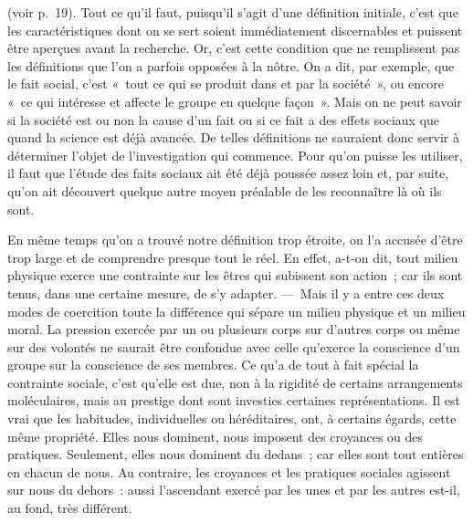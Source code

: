 \documentclass[french,twoside]{book} %
\begin{document}
(voir p. 19). Tout ce qu’il faut, puisqu’il s’agit d’une définition initiale, c’est que les caractéristiques dont on se sert soient immédiatement discernables et puissent être aperçues avant la recherche. Or, c’est cette condition que ne remplissent pas les définitions que l’on a parfois opposées à la nôtre. On a dit, par exemple, que le fait social, c’est « tout ce qui se produit dans et par la société », ou encore « ce qui intéresse et affecte le groupe en quelque façon ». Mais on ne peut savoir si la société est ou non la cause d’un fait ou si ce fait a des effets sociaux que quand la science est déjà avancée. De telles définitions ne sauraient donc servir à déterminer l’objet de l’investigation qui commence. Pour qu’on puisse les utiliser, il faut que l’étude des faits sociaux ait été déjà poussée assez loin et, par suite, qu’on ait découvert quelque autre moyen préalable de les reconnaître là où ils sont.\par
En même temps qu’on a trouvé notre définition trop étroite, on l’a accusée d’être trop large et de comprendre presque tout le réel. En effet, a-t-on dit, tout milieu physique exerce une contrainte sur les êtres qui subissent son action ; car ils sont tenus, dans une certaine mesure, de s’y adapter. — Mais il y a entre ces deux modes de coercition toute la différence qui sépare un milieu physique et un milieu moral. La pression exercée par un ou plusieurs corps sur d’autres corps ou même sur des volontés ne saurait être confondue avec celle qu’exerce la conscience d’un groupe sur la conscience de ses membres. Ce qu’a de tout à fait spécial la contrainte sociale, c’est qu’elle est due, non à la rigidité de certains arrangements moléculaires, mais au prestige dont sont investies certaines représentations. Il est vrai que les habitudes, individuelles ou héréditaires, ont, à certains égards, cette même propriété. Elles nous dominent, nous imposent des croyances ou des pratiques. Seulement, elles nous dominent du dedans ; car elles sont tout entières en chacun de nous. Au contraire, les croyances et les pratiques sociales agissent sur nous du dehors : aussi l’ascendant exercé par les unes et par les autres est-il, au fond, très différent.\par
\end{document}
